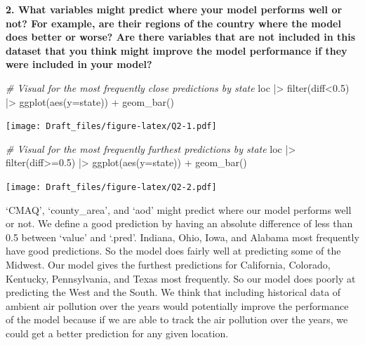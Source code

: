 \documentclass[
]{article}
\newenvironment{Shaded}{\begin{snugshade}}{\end{snugshade}}
\newcommand{\AttributeTok}[1]{\textcolor[rgb]{0.77,0.63,0.00}{#1}}
\newcommand{\CommentTok}[1]{\textcolor[rgb]{0.56,0.35,0.01}{\textit{#1}}}
\newcommand{\FloatTok}[1]{\textcolor[rgb]{0.00,0.00,0.81}{#1}}
\newcommand{\FunctionTok}[1]{\textcolor[rgb]{0.00,0.00,0.00}{#1}}
\newcommand{\NormalTok}[1]{#1}
\newcommand{\SpecialCharTok}[1]{\textcolor[rgb]{0.00,0.00,0.00}{#1}}
\begin{document}
\textbf{2. What variables might predict where your model performs well
or not? For example, are their regions of the country where the model
does better or worse? Are there variables that are not included in this
dataset that you think might improve the model performance if they were
included in your model?}

\begin{Shaded}
\begin{Highlighting}[]
\CommentTok{\# Visual for the most frequently close predictions by state}
\NormalTok{loc }\SpecialCharTok{|\textgreater{}} \FunctionTok{filter}\NormalTok{(diff}\SpecialCharTok{\textless{}}\FloatTok{0.5}\NormalTok{) }\SpecialCharTok{|\textgreater{}} \FunctionTok{ggplot}\NormalTok{(}\FunctionTok{aes}\NormalTok{(}\AttributeTok{y=}\NormalTok{state)) }\SpecialCharTok{+} \FunctionTok{geom\_bar}\NormalTok{()}
\end{Highlighting}
\end{Shaded}

\texttt{[image: Draft\_files/figure-latex/Q2-1.pdf]}

\begin{Shaded}
\begin{Highlighting}[]
\CommentTok{\# Visual for the most frequently furthest predictions by state}
\NormalTok{loc }\SpecialCharTok{|\textgreater{}} \FunctionTok{filter}\NormalTok{(diff}\SpecialCharTok{\textgreater{}=}\FloatTok{0.5}\NormalTok{) }\SpecialCharTok{|\textgreater{}} \FunctionTok{ggplot}\NormalTok{(}\FunctionTok{aes}\NormalTok{(}\AttributeTok{y=}\NormalTok{state)) }\SpecialCharTok{+} \FunctionTok{geom\_bar}\NormalTok{()}
\end{Highlighting}
\end{Shaded}

\texttt{[image: Draft\_files/figure-latex/Q2-2.pdf]}

`CMAQ', `county\_area', and `aod' might predict where our model performs
well or not. We define a good prediction by having an absolute
difference of less than 0.5 between `value' and `.pred'. Indiana, Ohio,
Iowa, and Alabama most frequently have good predictions. So the model
does fairly well at predicting some of the Midwest. Our model gives the
furthest predictions for California, Colorado, Kentucky, Pennsylvania,
and Texas most frequently. So our model does poorly at predicting the
West and the South. We think that including historical data of ambient
air pollution over the years would potentially improve the performance
of the model because if we are able to track the air pollution over the
years, we could get a better prediction for any given location.
\end{document}
